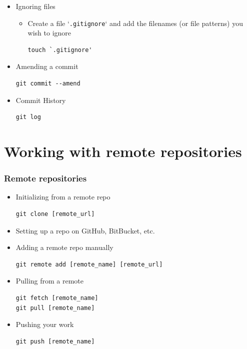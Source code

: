 \documentclass[10pt,t,sans,mathsans,xcolor=dvipsnames]{beamer}
\begin{document}
\begin{frame}
\begin{itemize}
\begin{itemize}
\end{itemize}
\item Ignoring files
\begin{itemize}
\item Create a file `\texttt{.gitignore}` and add the filenames (or file patterns) you wish to ignore
\begin{lstlisting}
touch `.gitignore'
\end{lstlisting}
\end{itemize}
\item Amending a commit
\begin{lstlisting}
git commit --amend
\end{lstlisting}
\item Commit History
\begin{lstlisting}
git log
\end{lstlisting}
\end{itemize}
\end{frame}
\section{Working with remote repositories}
\begin{frame}[fragile]
\frametitle{Remote repositories}
\begin{itemize}[<+->]
\item Initializing from a remote repo
\begin{lstlisting}
git clone [remote_url]
\end{lstlisting}
\item Setting up a repo on GitHub, BitBucket, etc.
\item Adding a remote repo manually
\begin{lstlisting}
git remote add [remote_name] [remote_url]
\end{lstlisting}
\item Pulling from a remote
\begin{lstlisting}
git fetch [remote_name]
git pull [remote_name]
\end{lstlisting}
\item Pushing your work
\begin{lstlisting}
git push [remote_name]
\end{lstlisting}
\end{itemize}
\end{frame}
\end{document}
